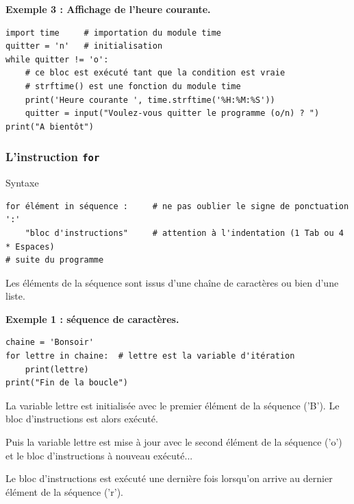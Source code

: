 \documentclass{beamer}
\begin{document}
\begin{frame}

\noindent\textbf{Exemple 3 : Affichage de l'heure courante.}
\begin{verbatim}
import time     # importation du module time
quitter = 'n'   # initialisation
while quitter != 'o':
    # ce bloc est exécuté tant que la condition est vraie
    # strftime() est une fonction du module time
    print('Heure courante ', time.strftime('%H:%M:%S'))
    quitter = input("Voulez-vous quitter le programme (o/n) ? ")
print("A bientôt")
\end{verbatim}
\end{frame}

\begin{frame}
\frametitle{L'instruction \texttt{for}}

\begin{block}{Syntaxe }

\begin{verbatim}
for élément in séquence :     # ne pas oublier le signe de ponctuation ':'
    "bloc d'instructions"     # attention à l'indentation (1 Tab ou 4 * Espaces)
# suite du programme
\end{verbatim}
\end{block}

Les éléments de la séquence sont issus d'une chaîne de caractères ou bien d'une liste.
\end{frame}

\begin{frame}

\noindent\textbf{Exemple 1 : séquence de caractères.}
\begin{verbatim}
chaine = 'Bonsoir'
for lettre in chaine:  # lettre est la variable d'itération
    print(lettre)
print("Fin de la boucle")
\end{verbatim}

La variable lettre est initialisée avec le premier élément de la séquence ('B').
Le bloc d'instructions est alors exécuté.

Puis la variable lettre est mise à jour avec le second élément de la séquence ('o') et le bloc d'instructions à nouveau exécuté...

Le bloc d'instructions est exécuté une dernière fois lorsqu'on arrive au dernier élément de la séquence ('r').
\end{frame}
\end{document}
